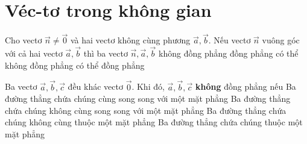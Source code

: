 \section{Véc-tơ trong không gian}
\begin{ex}%
	Cho vectơ $\overrightarrow{n}\ne \overrightarrow{0}$ và hai vectơ không cùng phương $\overrightarrow{a}, \overrightarrow{b}$. Nếu vectơ $\overrightarrow{n}$ vuông góc với cả hai vectơ $\overrightarrow{a}, \overrightarrow{b}$ thì ba vectơ $\overrightarrow{n}, \overrightarrow{a}, \overrightarrow{b}$ 
	\choice
	{\True không đồng phẳng}
	{đồng phẳng}
	{có thể không đồng phẳng}
	{có thể đồng phẳng}
\end{ex}
\begin{ex}%
	Ba vectơ $\overrightarrow{a}, \overrightarrow{b}, \overrightarrow{c}$ đều khác vectơ $\overrightarrow{0}$. Khi đó, $\overrightarrow{a}, \overrightarrow{b}, \overrightarrow{c}$ \textbf{không} đồng phẳng nếu
	\choice
	{Ba đường thẳng chứa chúng cùng song song với một mặt phẳng}
	{\True Ba đường thẳng chứa chúng không cùng song song với một mặt phẳng}
	{Ba đường thẳng chứa chúng không cùng thuộc một mặt phẳng}
	{Ba đường thẳng chứa chúng thuộc một mặt phẳng}
\end{ex}
